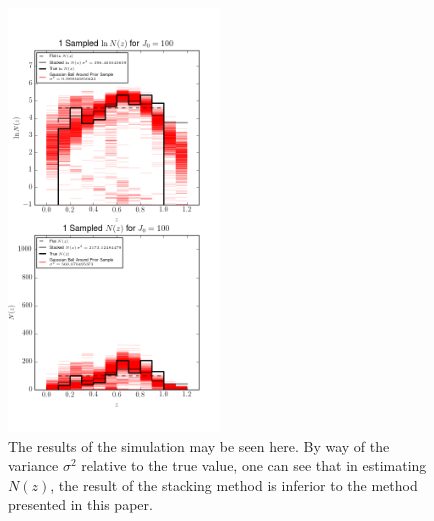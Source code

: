 \documentclass[preprint]{aastex}
\newcommand{\textul}{\underline}
\begin{document}
\begin{figure}
\includegraphics[width=0.5\textwidth]{real/samps.png}
\caption{The results of the simulation may be seen here.  By way of the variance $\sigma^{2}$ relative to the true value, one can see that in estimating $N(z)$, the result of the stacking method is inferior to the method presented in this paper.}
\label{fig:realparam}
\end{figure}


\end{document}

